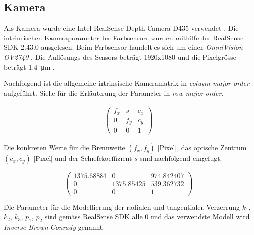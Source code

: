 \subsection{Kamera}\label{kap:camera}

Als Kamera wurde eine Intel RealSense Depth Camera D435 verwendet \cite{intel:realsense_d435}.
Die intrinsischen Kameraparameter des Farbsensors wurden mithilfe des RealSense SDK 2.43.0 \cite{github:realsense_sdk}
ausgelesen. Beim Farbsensor handelt es sich um einen \emph{OmniVision OV2740} \cite{intel:realsense_d435_datasheet}.
Die Auflösungs des Sensors beträgt 1920x1080 und die Pixelgrösse beträgt \SI{1.4}{\micro\metre} \cite{omnivision:ov2740}.

Nachfolgend ist die allgemeine intrinsische Kameramatrix in \emph{column-major order} aufgeführt.
Siehe \cite{matlab:what_is_camera_calibration} für die Erläuterung der Parameter in \emph{row-major order}.

\begin{align}
    \begin{pmatrix}
    f_x & s   & c_x\\
    0   & f_y & c_y\\
    0   & 0   & 1
    \end{pmatrix}
\end{align}

Die konkreten Werte für die Brennweite $(f_x, f_y)$ [Pixel], das optische Zentrum $(c_x, c_y)$ [Pixel]
und der Schiefekoeffizient $s$ sind nachfolgend eingefügt.

\begin{equation}
\begin{pmatrix}
1375.68884 & 0          & 974.842407\\
0          & 1375.85425 & 539.362732\\
0          & 0          & 1
\end{pmatrix}
\end{equation}

Die Parameter für die Modellierung der radialen und tangentialen Verzerrung $k_1$, $k_2$, $k_3$, $p_1$, $p_2$ sind gemäss
RealSense SDK alle 0 und das verwendete Modell wird \emph{Inverse Brown-Conrady} genannt.

